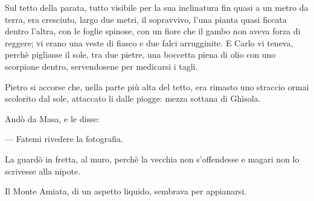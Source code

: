 Sul tetto della parata, tutto visibile per la sua inclinatura fin quasi a un metro da terra, era cresciuto, largo due metri, il sopravvivo, l'una pianta quasi ficcata dentro l'altra, con le foglie spinose, con un fiore che il gambo non aveva forza di reggere; vi erano una veste di fiasco e due falci arrugginite. E Carlo vi teneva, perchè pigliasse il sole, tra due pietre, una boccetta piena di olio con uno scorpione dentro, servendosene per medicarsi i tagli.

Pietro si accorse che, nella parte più alta del tetto, era rimasto uno straccio ormai scolorito dal sole, attaccato li dalle piogge: mezza sottana di Ghìsola.

Andò da Masa, e le disse:

— Fatemi rivedere la fotografia.

La guardò in fretta, al muro, perchè la vecchia non s’offendesse e magari non lo scrivesse alla nipote.

Il Monte Amiata, di un aspetto liquido, sembrava per appianarsi.
